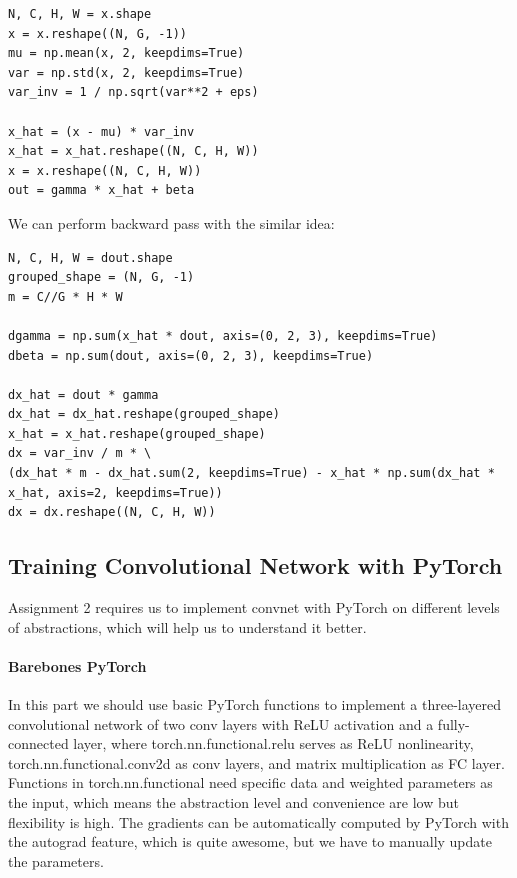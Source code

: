 \documentclass{article} %
\begin{document}
\begin{lstlisting}
N, C, H, W = x.shape
x = x.reshape((N, G, -1))
mu = np.mean(x, 2, keepdims=True)
var = np.std(x, 2, keepdims=True)
var_inv = 1 / np.sqrt(var**2 + eps)

x_hat = (x - mu) * var_inv
x_hat = x_hat.reshape((N, C, H, W))
x = x.reshape((N, C, H, W))
out = gamma * x_hat + beta
\end{lstlisting}

We can perform backward pass with the similar idea:
\begin{lstlisting}
N, C, H, W = dout.shape
grouped_shape = (N, G, -1)
m = C//G * H * W

dgamma = np.sum(x_hat * dout, axis=(0, 2, 3), keepdims=True)
dbeta = np.sum(dout, axis=(0, 2, 3), keepdims=True)

dx_hat = dout * gamma
dx_hat = dx_hat.reshape(grouped_shape)
x_hat = x_hat.reshape(grouped_shape)
dx = var_inv / m * \
(dx_hat * m - dx_hat.sum(2, keepdims=True) - x_hat * np.sum(dx_hat * x_hat, axis=2, keepdims=True))
dx = dx.reshape((N, C, H, W))
\end{lstlisting}

\subsection{Training Convolutional Network with PyTorch}
Assignment 2 requires us to implement convnet with PyTorch on different levels of abstractions, which will help us to understand it better.

\paragraph{Barebones PyTorch}
In this part we should use basic PyTorch functions to implement a three-layered convolutional network of two conv layers with ReLU activation and a fully-connected layer, where torch.nn.functional.relu serves as ReLU nonlinearity, torch.nn.functional.conv2d as conv layers, and matrix multiplication as FC layer. Functions in torch.nn.functional need specific data and weighted parameters as the input, which means the abstraction level and convenience are low but flexibility is high. The gradients can be automatically computed by PyTorch with the autograd feature, which is quite awesome, but we have to manually update the parameters.
\end{document}
